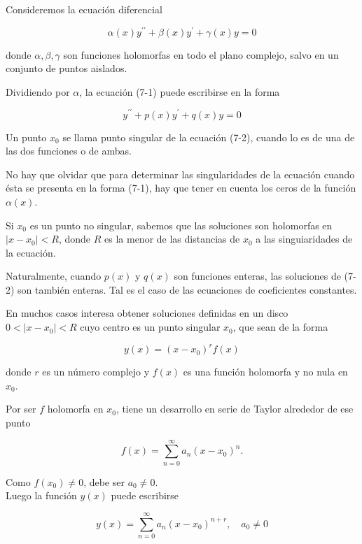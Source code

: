 \documentclass[10pt]{article}
\theoremstyle{plain}
\theoremstyle{definition}
\theoremstyle{remark}
\begin{document}
Consideremos la ecuación diferencial


\begin{equation*}
\alpha(x) y^{\prime \prime}+\beta(x) y^{\prime}+\gamma(x) y=0 \tag{7:1}
\end{equation*}


donde $\alpha, \beta, \gamma$ son funciones holomorfas en todo el plano complejo, salvo en un conjunto de puntos aislados.

Dividiendo por $\alpha$, la ecuación (7-1) puede escribirse en la forma


\begin{equation*}
y^{\prime \prime}+p(x) y^{\prime}+q(x) y=0 \tag{7-2}
\end{equation*}


Un punto $x_{0}$ se llama punto singular de la ecuación (7-2), cuando lo es de una de las dos funciones o de ambas.

No hay que olvidar que para determinar las singularidades de la ecuación cuando ésta se presenta en la forma (7-1), hay que tener en cuenta los ceros de la función $\alpha(x)$.

Si $x_{0}$ es un punto no singular, sabemos que las soluciones son holomorfas en $\left|x-x_{0}\right|<R$, donde $R$ es la menor de las distancias de $x_{0}$ a las singuiaridades de la ecuación.

Naturalmente, cuando $p(x)$ y $q(x)$ son funciones enteras, las soluciones de (7-2) son también enteras. Tal es el caso de las ecuaciones de coeficientes constantes.

En muchos casos interesa obtener soluciones definidas en un disco $0<\left|x-x_{0}\right|<R$ cuyo centro es un punto singular $x_{0}$, que sean de la forma

$$
y(x)=\left(x-x_{0}\right)^{r} f(x)
$$

donde $r$ es un número complejo y $f(x)$ es una función holomorfa y no nula en $x_{0}$.

Por ser $f$ holomorfa en $x_{0}$, tiene un desarrollo en serie de Taylor alrededor de ese punto

$$
f(x)=\sum_{n=0}^{\infty} a_{n}\left(x-x_{0}\right)^{n} .
$$

Como $f\left(x_{0}\right) \neq 0$, debe ser $a_{0} \neq 0$.\\
Luego la función $y(x)$ puede escribirse


\begin{equation*}
y(x)=\sum_{n=0}^{\infty} a_{n}\left(x-x_{0}\right)^{n+r}, \quad a_{0} \neq 0 \tag{7-3}
\end{equation*}
\end{document}
